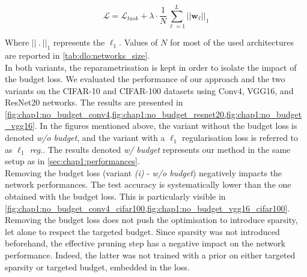 \begin{equation}
  \label{eqn:chap1:globalloss_l1}
  \mathcal{L} = \mathcal{L}_{task} + \lambda \cdot \frac{1}{N} \sum_{\ell=1}^{L} || \mathbf{w}_\ell ||_1
\end{equation}

Where $||~.~||_1$ represents the $\ell_1$. Values of $N$ for most of the used
architectures are reported in \cref{tab:dlo:networks_size}.\\

In both variants, the reparametrisation is kept in order to isolate the impact
of the budget loss. We evaluated the performance of our approach and the two
variants on the CIFAR-10 and CIFAR-100 datasets using Conv4, VGG16, and ResNet20
networks. The results are presented in
\cref{fig:chap1:no_budget_conv4,fig:chap1:no_budget_resnet20,fig:chap1:no_budget_vgg16}.
In the figures mentioned above, the variant without the budget loss is denoted
\emph{w/o budget}, and the variant with a $\ell_1$ regularisation loss is
referred to as \emph{$\ell_1$ reg.}. The results denoted \emph{w/ budget}
represents our method in the same setup as in \cref{sec:chap1:performances}.\\

Removing the budget loss (variant \emph{(i)} - \emph{w/o budget}) negatively
impacts the network performances. The test accuracy is systematically lower than
the one obtained with the budget loss. This is particularly visible in
\cref{fig:chap1:no_budget_conv4_cifar100,fig:chap1:no_budget_vgg16_cifar100}.
Removing the budget loss does not push the optimisation to introduce sparsity,
let alone to respect the targeted budget. Since sparsity was not introduced
beforehand, the effective pruning step has a negative impact on the network
performance. Indeed, the latter was not trained with a prior on either targeted
sparsity or targeted budget, embedded in the loss.\\



